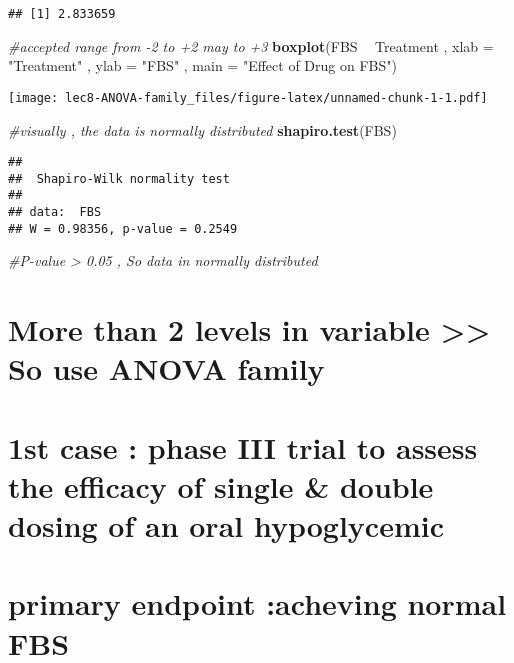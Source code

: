 \documentclass[]{article}
\newenvironment{Shaded}{\begin{snugshade}}{\end{snugshade}}
\newcommand{\KeywordTok}[1]{\textcolor[rgb]{0.13,0.29,0.53}{\textbf{#1}}}
\newcommand{\DataTypeTok}[1]{\textcolor[rgb]{0.13,0.29,0.53}{#1}}
\newcommand{\StringTok}[1]{\textcolor[rgb]{0.31,0.60,0.02}{#1}}
\newcommand{\CommentTok}[1]{\textcolor[rgb]{0.56,0.35,0.01}{\textit{#1}}}
\newcommand{\OperatorTok}[1]{\textcolor[rgb]{0.81,0.36,0.00}{\textbf{#1}}}
\newcommand{\NormalTok}[1]{#1}
\begin{document}
\begin{verbatim}
## [1] 2.833659
\end{verbatim}

\begin{Shaded}
\begin{Highlighting}[]
\CommentTok{#accepted range from -2 to +2 may to +3}
\KeywordTok{boxplot}\NormalTok{(FBS }\OperatorTok{~}\StringTok{ }\NormalTok{Treatment , }\DataTypeTok{xlab =} \StringTok{"Treatment"}\NormalTok{ , }\DataTypeTok{ylab =} \StringTok{"FBS"}\NormalTok{ , }\DataTypeTok{main =} \StringTok{"Effect of Drug on FBS"}\NormalTok{)}
\end{Highlighting}
\end{Shaded}

\texttt{[image: lec8-ANOVA-family\_files/figure-latex/unnamed-chunk-1-1.pdf]}

\begin{Shaded}
\begin{Highlighting}[]
\CommentTok{#visually , the data is normally distributed}
\KeywordTok{shapiro.test}\NormalTok{(FBS)}
\end{Highlighting}
\end{Shaded}

\begin{verbatim}
## 
##  Shapiro-Wilk normality test
## 
## data:  FBS
## W = 0.98356, p-value = 0.2549
\end{verbatim}

\begin{Shaded}
\begin{Highlighting}[]
\CommentTok{#P-value > 0.05 , So data in normally distributed }
\end{Highlighting}
\end{Shaded}

\section{More than 2 levels in variable \textgreater{}\textgreater{} So
use ANOVA
family}\label{more-than-2-levels-in-variable-so-use-anova-family}

\section{1st case : phase III trial to assess the efficacy of single \&
double dosing of an oral
hypoglycemic}\label{st-case-phase-iii-trial-to-assess-the-efficacy-of-single-double-dosing-of-an-oral-hypoglycemic}

\section{primary endpoint :acheving normal
FBS}\label{primary-endpoint-acheving-normal-fbs}
\end{document}
